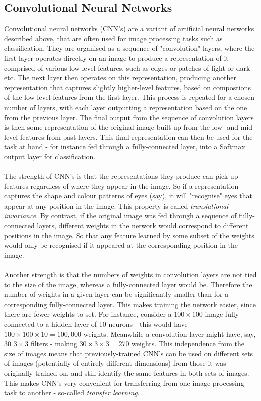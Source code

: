 \documentclass[11pt]{article} %
\theoremstyle{plain}
\theoremstyle{definition}
\begin{document}
\newpage
\subsection{Convolutional Neural Networks}
Convolutional neural networks (CNN's) are a variant of artificial neural networks described above, that are often used for image processing tasks such as classification. They are organised as a sequence of "convolution" layers, where the first layer operates directly on an image to produce a representation of it comprised of various low-level features, such as edges or patches of light or dark etc. The next layer then operates on this representation, producing another representation that captures slightly higher-level features, based on compostions of the low-level features from the first layer. This process is repeated for a chosen number of layers, with each layer outputting a representation based on the one from the previous layer. The final output from the sequence of convolution layers is then some representation of the original image built up from the low- and mid-level features from past layers. This final representation can then be used for the task at hand - for instance fed through a fully-connected layer, into a Softmax output layer for classification.     
\\
\\
\noindent
The strength of CNN's is that the representations they produce can pick up features regardless of where they appear in the image. So if a representation captures the shape and colour patterns of eyes (say), it will "recognise" eyes that appear at any position in the image. This property is called \textit{translational invariance}. By contrast, if the original image was fed through a sequence of fully-connected layers, different weights in the network would correspond to different positions in the image. So that any feature learned by some subset of the weights would only be recognised if it appeared at the corresponding position in the image.
\\
\\
\noindent
Another strength is that the numbers of weights in convolution layers are not tied to the size of the image, whereas a fully-connected layer would be. Therefore the number of weights in a given layer can be significantly smaller than for a corresponding fully-connected layer. This makes training the network easier, since there are fewer weights to set. For instance, consider a \(100 \times 100\) image fully-connected to a hidden layer of 10 neurons - this would have \(100 \times 100 \times 10 = 100,000\) weights. Meanwhile a convolution layer might have, say, 30 \(3 \times 3\) filters - making \(30 \times 3 \times 3 = 270\) weights. This independence from the size of images means that previously-trained CNN's can be used on different sets of images (potentially of entirely different dimensions) from those it was originally trained on, and still identify the same features in both sets of images. This makes CNN's very convenient for transferring from one image processing task to another - so-called \textit{transfer learning}. 
\end{document}
